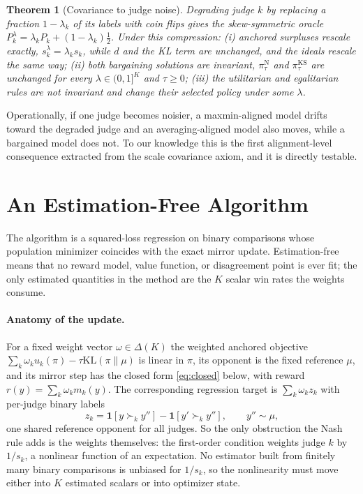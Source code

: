\documentclass[letterpaper]{article} %
\newtheorem{theorem}{Theorem}
\newcommand{\KL}{\mathrm{KL}}
\begin{document}
\begin{theorem}[Covariance to judge noise]
\label{thm:cov}
Degrading judge $k$ by replacing a fraction $1-\lambda_k$ of its labels with coin flips gives the skew-symmetric oracle $P^\lambda_k=\lambda_kP_k+(1-\lambda_k)\tfrac12$. Under this compression: (i) anchored surpluses rescale exactly, $s^\lambda_k=\lambda_ks_k$, while $d$ and the KL term are unchanged, and the ideals rescale the same way; (ii) both bargaining solutions are invariant, $\pi^{\mathrm N}_\tau$ and $\pi^{\mathrm{KS}}_\tau$ are unchanged for every $\lambda\in(0,1]^K$ and $\tau\ge0$; (iii) the utilitarian and egalitarian rules are not invariant and change their selected policy under some $\lambda$.
\end{theorem}
Operationally, if one judge becomes noisier, a maxmin-aligned model drifts toward the degraded judge and an averaging-aligned model also moves, while a bargained model does not. To our knowledge this is the first alignment-level consequence extracted from the scale covariance axiom, and it is directly testable.

\section{An Estimation-Free Algorithm}
\label{sec:algo}
The algorithm is a squared-loss regression on binary comparisons whose population minimizer coincides with the exact mirror update. Estimation-free means that no reward model, value function, or disagreement point is ever fit; the only estimated quantities in the method are the $K$ scalar win rates the weights consume.

\paragraph{Anatomy of the update.}
For a fixed weight vector $\omega\in\Delta(K)$ the weighted anchored objective $\sum_k\omega_ku_k(\pi)-\tau\KL(\pi\|\mu)$ is linear in $\pi$, its opponent is the fixed reference $\mu$, and its mirror step has the closed form \eqref{eq:closed} below, with reward $r(y)=\sum_k\omega_km_k(y)$. The corresponding regression target is $\sum_k\omega_kz_k$ with per-judge binary labels
\begin{equation}
z_k=\mathbf 1[y\succ_k y'']-\mathbf 1[y'\succ_k y''],\qquad y''\sim\mu,
\label{eq:target}
\end{equation}
one shared reference opponent for all judges. So the only obstruction the Nash rule adds is the weights themselves: the first-order condition weights judge $k$ by $1/s_k$, a nonlinear function of an expectation. No estimator built from finitely many binary comparisons is unbiased for $1/s_k$, so the nonlinearity must move either into $K$ estimated scalars or into optimizer state.
\end{document}
